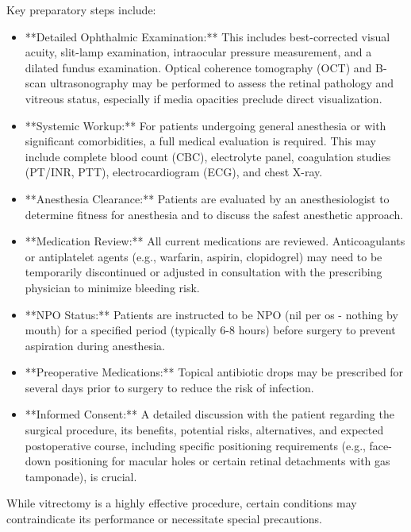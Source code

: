 Key preparatory steps include:

\begin{itemize}
  \item **Detailed Ophthalmic Examination:** This includes best-corrected visual acuity, slit-lamp examination, intraocular pressure measurement, and a dilated fundus examination. Optical coherence tomography (OCT) and B-scan ultrasonography may be performed to assess the retinal pathology and vitreous status, especially if media opacities preclude direct visualization.
  
  \item **Systemic Workup:** For patients undergoing general anesthesia or with significant comorbidities, a full medical evaluation is required. This may include complete blood count (CBC), electrolyte panel, coagulation studies (PT/INR, PTT), electrocardiogram (ECG), and chest X-ray.
  
  \item **Anesthesia Clearance:** Patients are evaluated by an anesthesiologist to determine fitness for anesthesia and to discuss the safest anesthetic approach.
  
  \item **Medication Review:** All current medications are reviewed. Anticoagulants or antiplatelet agents (e.g., warfarin, aspirin, clopidogrel) may need to be temporarily discontinued or adjusted in consultation with the prescribing physician to minimize bleeding risk.
  
  \item **NPO Status:** Patients are instructed to be NPO (nil per os - nothing by mouth) for a specified period (typically 6-8 hours) before surgery to prevent aspiration during anesthesia.
  
  \item **Preoperative Medications:** Topical antibiotic drops may be prescribed for several days prior to surgery to reduce the risk of infection.
  
  \item **Informed Consent:** A detailed discussion with the patient regarding the surgical procedure, its benefits, potential risks, alternatives, and expected postoperative course, including specific positioning requirements (e.g., face-down positioning for macular holes or certain retinal detachments with gas tamponade), is crucial.
\end{itemize}

While vitrectomy is a highly effective procedure, certain conditions may contraindicate its performance or necessitate special precautions.

